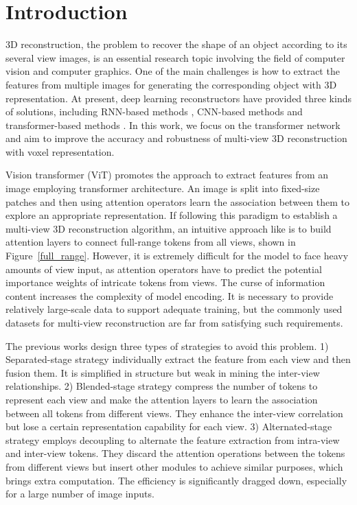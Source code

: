 \documentclass[10pt,twocolumn,letterpaper]{article}
\begin{document}
\section{Introduction}
\label{Introduction}
3D reconstruction, the problem to recover the shape of an object according to its several view images, is an essential research topic involving the field of computer vision and computer graphics. One of the main challenges is how to extract the features from multiple images for generating the corresponding object with 3D representation. At present, deep learning reconstructors have provided three kinds of solutions, including RNN-based methods \cite{choy20163d, kar2017learning}, CNN-based methods \cite{su2015multi, wang20173densinet, huang2018deepmvs, paschalidou2018raynet, xie2019pix2vox, xie2020pix2vox++, yang2020robust, zhu2023garnet} and transformer-based methods \cite{wang2021multi, yagubbayli2021legoformer, shi20213d, zhu2023umi}. In this work, we focus on the transformer network and aim to improve the accuracy and robustness of multi-view 3D reconstruction with voxel representation.

Vision transformer (ViT) \cite{dosovitskiy2021image} promotes the approach to extract features from an image employing transformer architecture. An image is split into fixed-size patches and then using attention operators learn the association between them to explore an appropriate representation. If following this paradigm to establish a multi-view 3D reconstruction algorithm, an intuitive approach like \cite{zeng2020learning} is to build attention layers to connect full-range tokens from all views, shown in Figure~\ref{full_range}. However, it is extremely difficult for the model to face heavy amounts of view input, as attention operators have to predict the potential importance weights of intricate tokens from views. The curse of information content increases the complexity of model encoding. It is necessary to provide relatively large-scale data to support adequate training, but the commonly used datasets for multi-view reconstruction are far from satisfying such requirements.

The previous works design three types of strategies to avoid this problem. 1) Separated-stage strategy \cite{shi20213d} individually extract the feature from each view and then fusion them. It is simplified in structure but weak in mining the inter-view relationships. 2) Blended-stage strategy \cite{wang2021multi, yagubbayli2021legoformer} compress the number of tokens to represent each view and make the attention layers to learn the association between all tokens from different views. They enhance the inter-view correlation but lose a certain representation capability for each view. 3) Alternated-stage strategy \cite{zhu2023umi} employs decoupling to alternate the feature extraction from intra-view and inter-view tokens. They discard the attention operations between the tokens from different views but insert other modules to achieve similar purposes, which brings extra computation. The efficiency is significantly dragged down, especially for a large number of image inputs.
\end{document}
